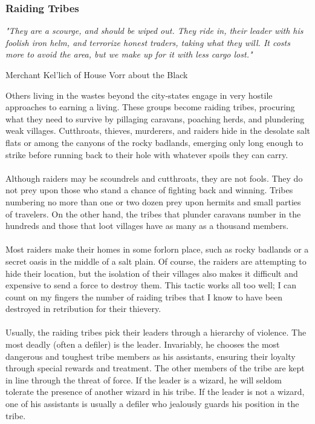 \begin{multicols}{2}
\subsubsection{Raiding Tribes}
\epigraph{\textit{
"They are a scourge, and should be wiped out. They ride
in, their leader with his foolish iron helm, and terrorize
honest traders, taking what they will. It costs more to
avoid the area, but we make up for it with less cargo lost." }}
{ Merchant Kel'lich of House Vorr about the Black }

Others living in the wastes beyond the city‐states
engage in very hostile approaches to earning a living.
These groups become raiding tribes, procuring what they
need to survive by pillaging caravans, poaching herds,
and plundering weak villages. Cutthroats, thieves,
murderers, and raiders hide in the desolate salt flats or
among the canyons of the rocky badlands, emerging only
long enough to strike before running back to their hole
with whatever spoils they can carry.\\
\\
Although raiders may be scoundrels and cutthroats,
they are not fools. They do not prey upon those who
stand a chance of fighting back and winning. Tribes
numbering no more than one or two dozen prey upon
hermits and small parties of travelers. On the other hand,
the tribes that plunder caravans number in the hundreds
and those that loot villages have as many as a thousand
members.\\
\\
Most raiders make their homes in some forlorn place,
such as rocky badlands or a secret oasis in the middle of a
salt plain. Of course, the raiders are attempting to hide
their location, but the isolation of their villages also makes
it difficult and expensive to send a force to destroy them.
This tactic works all too well; I can count on my fingers
the number of raiding tribes that I know to have been
destroyed in retribution for their thievery.\\
\\
Usually, the raiding tribes pick their leaders through a
hierarchy of violence. The most deadly (often a defiler) is
the leader. Invariably, he chooses the most dangerous and
toughest tribe members as his assistants, ensuring their
loyalty through special rewards and treatment. The other
members of the tribe are kept in line through the threat of
force. If the leader is a wizard, he will seldom tolerate the
presence of another wizard in his tribe. If the leader is not
a wizard, one of his assistants is usually a defiler who
jealously guards his position in the tribe.

\end{multicols}

